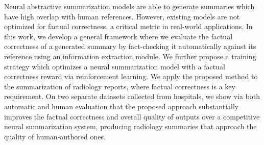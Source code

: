 Neural abstractive summarization models are able to generate summaries which have high overlap with human references. However, existing models are not optimized for factual correctness, a critical metric in real-world applications. In this work, we develop a general framework where we evaluate the factual correctness of a generated summary by fact-checking it automatically against its reference using an information extraction module. We further propose a training strategy which optimizes a neural summarization model with a factual correctness reward via reinforcement learning. We apply the proposed method to the summarization of radiology reports, where factual correctness is a key requirement. On two separate datasets collected from hospitals, we show via both automatic and human evaluation that the proposed approach substantially improves the factual correctness and overall quality of outputs over a competitive neural summarization system, producing radiology summaries that approach the quality of human-authored ones.
